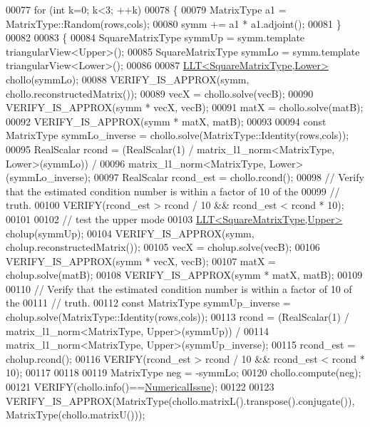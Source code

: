 \begin{DoxyCode}
00077   \textcolor{keywordflow}{for} (\textcolor{keywordtype}{int} k=0; k<3; ++k)
00078   \{
00079     MatrixType a1 = MatrixType::Random(rows,cols);
00080     symm += a1 * a1.adjoint();
00081   \}
00082 
00083   \{
00084     SquareMatrixType symmUp = symm.template triangularView<Upper>();
00085     SquareMatrixType symmLo = symm.template triangularView<Lower>();
00086 
00087     \hyperlink{group___cholesky___module_class_eigen_1_1_l_l_t}{LLT<SquareMatrixType,Lower>} chollo(symmLo);
00088     VERIFY\_IS\_APPROX(symm, chollo.reconstructedMatrix());
00089     vecX = chollo.solve(vecB);
00090     VERIFY\_IS\_APPROX(symm * vecX, vecB);
00091     matX = chollo.solve(matB);
00092     VERIFY\_IS\_APPROX(symm * matX, matB);
00093 
00094     \textcolor{keyword}{const} MatrixType symmLo\_inverse = chollo.solve(MatrixType::Identity(rows,cols));
00095     RealScalar rcond = (RealScalar(1) / matrix\_l1\_norm<MatrixType, Lower>(symmLo)) /
00096                              matrix\_l1\_norm<MatrixType, Lower>(symmLo\_inverse);
00097     RealScalar rcond\_est = chollo.rcond();
00098     \textcolor{comment}{// Verify that the estimated condition number is within a factor of 10 of the}
00099     \textcolor{comment}{// truth.}
00100     VERIFY(rcond\_est > rcond / 10 && rcond\_est < rcond * 10);
00101 
00102     \textcolor{comment}{// test the upper mode}
00103     \hyperlink{group___cholesky___module_class_eigen_1_1_l_l_t}{LLT<SquareMatrixType,Upper>} cholup(symmUp);
00104     VERIFY\_IS\_APPROX(symm, cholup.reconstructedMatrix());
00105     vecX = cholup.solve(vecB);
00106     VERIFY\_IS\_APPROX(symm * vecX, vecB);
00107     matX = cholup.solve(matB);
00108     VERIFY\_IS\_APPROX(symm * matX, matB);
00109 
00110     \textcolor{comment}{// Verify that the estimated condition number is within a factor of 10 of the}
00111     \textcolor{comment}{// truth.}
00112     \textcolor{keyword}{const} MatrixType symmUp\_inverse = cholup.solve(MatrixType::Identity(rows,cols));
00113     rcond = (RealScalar(1) / matrix\_l1\_norm<MatrixType, Upper>(symmUp)) /
00114                              matrix\_l1\_norm<MatrixType, Upper>(symmUp\_inverse);
00115     rcond\_est = cholup.rcond();
00116     VERIFY(rcond\_est > rcond / 10 && rcond\_est < rcond * 10);
00117 
00118 
00119     MatrixType neg = -symmLo;
00120     chollo.compute(neg);
00121     VERIFY(chollo.info()==\hyperlink{group__enums_gga85fad7b87587764e5cf6b513a9e0ee5eaaf9b736d310a664e7729d163a035cc5f}{NumericalIssue});
00122 
00123     VERIFY\_IS\_APPROX(MatrixType(chollo.matrixL().transpose().conjugate()), MatrixType(chollo.matrixU()));

\end{DoxyCode}
